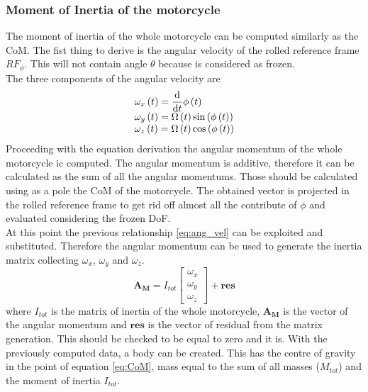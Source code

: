 \subsubsection{Moment of Inertia of the motorcycle}
%
The moment of inertia of the whole motorcycle can be computed similarly as the CoM.
The fist thing to derive is the angular velocity of the rolled reference frame $RF_\phi$. This will not contain angle $\theta$ because is considered as frozen.\\
The three components of the angular velocity are 
%
\begin{equation}
\label{eq:ang_vel}
\begin{array}{l} 
\displaystyle \omega_{x} \left( t \right) ={\frac {\rm d}{
{\rm d}t}}\phi \left( t \right) \\
\displaystyle \omega_{y} \left( t \right) =\Omega \left( t \right) \sin \left( \phi \left( t
 \right)  \right) \\ 
 \displaystyle \omega_{z} \left( t \right) =\Omega \left( t \right) \cos \left( \phi \left( t \right)  \right) 
\end{array} 
\end{equation}
%
Proceeding with the equation derivation the angular momentum of the whole motorcycle ic computed. The angular momentum is additive, therefore it can be calculated as the sum of all the angular momentums. Those should be calculated using as a pole the CoM of the motorcycle. The obtained vector is projected in the rolled reference frame to get rid off almost all the contribute of 
$\phi$ and evaluated considering the frozen DoF.\\
At this point the previous relationship \ref{eq:ang_vel} can be exploited and substituted. Therefore the angular momentum can be used to generate the inertia matrix collecting $\omega_{x}$, $\omega_{y}$ and $\omega_{z}$.
%
\begin{equation}
    \mathbf{A_M} = I_{tot} 
    \left[ 
    \begin{array}{c}
        \omega_x\\
        \omega_y\\
        \omega_z
    \end{array} 
    \right]
    + \mathbf{res}
\end{equation}
%
where $I_{tot}$ is the matrix of inertia of the whole motorcycle, $\mathbf{A_M}$ is the vector of the angular momentum and $\mathbf{res}$ is the vector of residual from the matrix generation. This should be checked to be equal to zero and it is.
With the previously computed data, a body can be created. This has the centre of gravity in the point of equation \ref{eq:CoM}, mass equal to the sum of all masses ($M_{tot}$) and the moment of inertia $I_{tot}$.  
%
